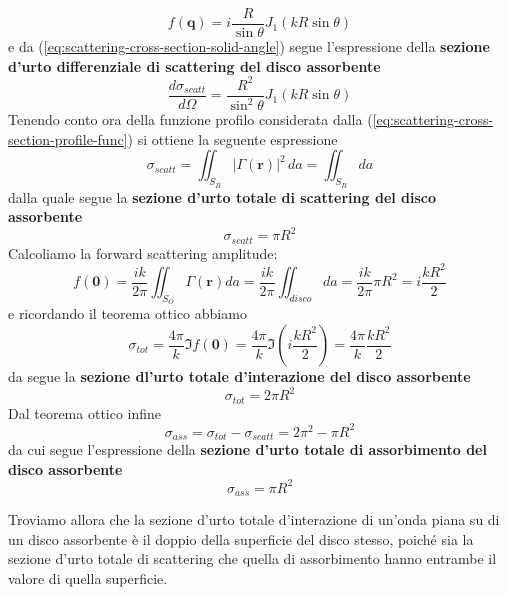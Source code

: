 \begin{equation}
	f(\bm{q}) = i \frac{R}{\sin \theta} J_1(kR \sin \theta)
	\label{eq:scattering-amplitude-bessel-one}
\end{equation}
e da (\ref{eq:scattering-cross-section-solid-angle}) segue l'espressione della \textbf{sezione d'urto differenziale di
scattering del disco assorbente}
\begin{equation}
	\frac{d \sigma_{scatt}}{d \Omega} = \frac{{R}^{2}}{\sin^2 \theta} J_1(kR \sin \theta)
    \label{eq:scattering-differential-cross-section-absorptive-disk}
\end{equation}
Tenendo conto ora della funzione profilo considerata dalla (\ref{eq:scattering-cross-section-profile-func}) si ottiene
la seguente espressione
\[
	\sigma_{scatt} = \iint_{S_B} |\Gamma(\bm{r})|^2 \, da = \iint_{S_B} da
\]
dalla quale segue la \textbf{sezione d'urto totale di scattering del disco assorbente}
\begin{equation}
	\sigma_{scatt} = \pi R^2
	\label{eq:total-scattering-cross-section-absorptive-disk}
\end{equation}
Calcoliamo la forward scattering amplitude:
\[
	f(\bm{0}) = \frac{ik}{2 \pi} \iint_{S_O} \Gamma (\bm{r}) da = \frac{ik}{2 \pi} \iint_{disco} da = \frac{ik}{2 \pi}
	\pi R^2 = i \frac{kR^2}{2}
\] e ricordando il teorema ottico abbiamo
\[
	\sigma_{tot} = \frac{4 \pi}{k} \Im f(\bm{0}) = \frac{4 \pi}{k} \Im \left(i  \frac{kR^2}{2}\right) = \frac{4 \pi}{k}\frac{kR^2}{2}
\]
da segue la \textbf{sezione dl'urto totale d'interazione del disco assorbente}
\begin{equation}
	\sigma_{tot} = 2 \pi R^2
	\label{eq:total-interaction-cross-section-absorptive-disk}
\end{equation}
Dal teorema ottico infine
\[
	\sigma_{ass} = \sigma_{tot} - \sigma_{scatt} = 2\pi ^2 - \pi R^2
\]
da cui segue l'espressione della \textbf{sezione d'urto totale di
assorbimento del disco assorbente}
\begin{equation}
	\sigma_{ass} = \pi R^2
	\label{eq:absorptive-cross-section-absorptive-disk}
\end{equation}

Troviamo allora che la sezione d'urto totale d'interazione di un'onda
piana su di un disco assorbente è il doppio della superficie del disco
stesso, poiché sia la sezione d'urto totale di scattering che quella di
assorbimento hanno entrambe il valore di quella superficie.
